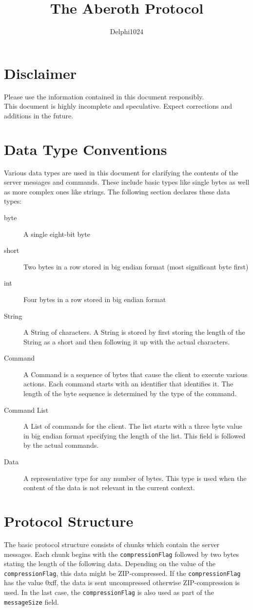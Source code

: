 \documentclass{article}
\newcommand{\field}[1]{\textcolor{fieldColor}{\texttt{#1}}}
\begin{document}
\title{The Aberoth Protocol}
\author{Delphi1024}
\maketitle

\section{Disclaimer}
Please use the information contained in this document responsibly.\\
This document is highly incomplete and speculative. Expect corrections and additions in the future. 

\section{Data Type Conventions}
Various data types are used in this document for clarifying the contents of the server messages and commands. These include basic types like single bytes as well as more complex ones like strings.
The following section declares these data types:
\begin{description}
\item [byte] A single eight-bit byte
\item [short] Two bytes in a row stored in big endian format (most significant byte first)
\item [int] Four bytes in a row stored in big endian format
\item [String] A String of characters. A String is stored by first storing the length of the String as a short and then following it up with the actual characters.
\item [Command] A Command is a sequence of bytes that cause the client to execute various actions. Each command starts with an identifier that identifies it.
The length of the byte sequence is determined by the type of the command.
\item [Command List] A List of commands for the client. The list starts with a three byte value in big endian format specifying the length of the list. This field is followed by the 
actual commands.
\item [Data] A representative type for any number of bytes. This type is used when the content of the data is not relevant in the current context.
\end{description}


\section{Protocol Structure}
The basic protocol structure consists of chunks which contain the server messages. Each chunk begins with the \field{compressionFlag} followed by two bytes stating the length of the following data.
Depending on the value of the \field{compressionFlag}, this data might be ZIP-compressed. If the \field{compressionFlag} has the value 0xff, the data is sent uncompressed otherwise ZIP-compression is used.
In the last case, the \field{compressionFlag} is also used as part of the \field{messageSize} field.
\end{document}
